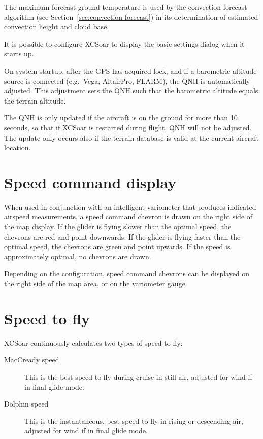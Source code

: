 \documentclass[a4paper,12pt]{refrep}
\begin{document}
The maximum forecast ground temperature is used by the convection
forecast algorithm (see Section~\ref{sec:convection-forecast}) in its
determination of estimated convection height and cloud base.

\tip It is possible to configure XCSoar to display the basic
settings dialog when it starts up.

On system startup, after the GPS has acquired lock, and if a
barometric altitude source is connected (e.g.\ Vega, AltairPro,
FLARM), the QNH is automatically adjusted.  This adjustment sets the
QNH such that the barometric altitude equals the terrain altitude.

The QNH is only updated if the aircraft is on the ground for more than
10 seconds, so that if XCSoar is restarted during flight, QNH will not
be adjusted.  The update only occurs also if the terrain database is
valid at the current aircraft location.

\section{Speed command display}

When used in conjunction with an intelligent variometer that produces
indicated airspeed measurements, a speed command chevron is drawn
on the right side of the map display.  If the glider is flying slower
than the optimal speed, the chevrons are red and point downwards.  If
the glider is flying faster than the optimal speed, the chevrons are
green and point upwards.  If the speed is approximately optimal, no
chevrons are drawn.


Depending on the configuration, speed command chevrons can be
displayed on the right side of the map area, or on the variometer
gauge.

\section{Speed to fly}

XCSoar continuously calculates two types of speed to fly:
\begin{description}
\item[MacCready speed]  This is the best speed to fly during cruise
  in still air, adjusted for wind if in final glide mode.
\item[Dolphin speed]  This is the instantaneous, best speed to fly
  in rising or descending air, adjusted for wind if in final glide
  mode.
\end{description}  
\end{document}
